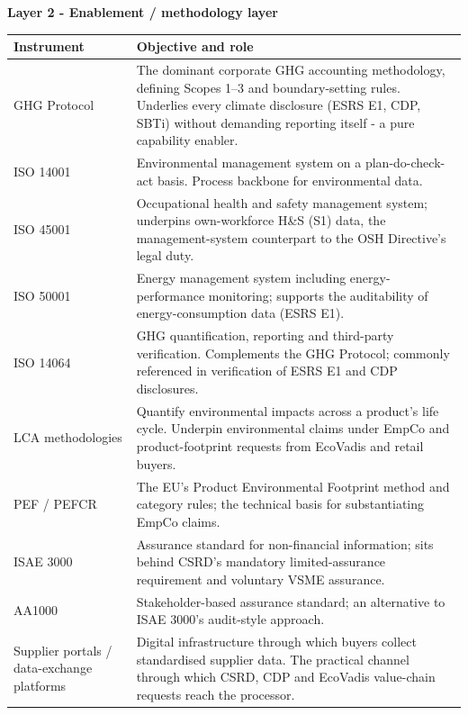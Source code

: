 \vspace{6pt}
\noindent\textbf{Layer 2 - Enablement / methodology layer}
\vspace{2pt}

\footnotesize
\begin{xltabular}{\textwidth}{@{} p{4.1cm} X @{}}
\toprule \textbf{Instrument} & \textbf{Objective and role} \\ \midrule \endhead
GHG Protocol & The dominant corporate GHG accounting methodology, defining Scopes
1--3 and boundary-setting rules. Underlies every climate disclosure (ESRS E1, CDP,
SBTi) without demanding reporting itself - a pure capability enabler. \\
ISO 14001 & Environmental management system on a plan-do-check-act basis. Process
backbone for environmental data. \\
ISO 45001 & Occupational health and safety management system; underpins
own-workforce H\&S (S1) data, the management-system counterpart to the OSH
Directive's legal duty. \\
ISO 50001 & Energy management system including energy-performance monitoring;
supports the auditability of energy-consumption data (ESRS E1). \\
ISO 14064 & GHG quantification, reporting and third-party verification.
Complements the GHG Protocol; commonly referenced in verification of ESRS E1 and
CDP disclosures. \\
LCA methodologies & Quantify environmental impacts across a product's life cycle.
Underpin environmental claims under EmpCo and product-footprint requests from
EcoVadis and retail buyers. \\
PEF / PEFCR & The EU's Product Environmental Footprint method and category rules;
the technical basis for substantiating EmpCo claims. \\
ISAE 3000 & Assurance standard for non-financial information; sits behind CSRD's
mandatory limited-assurance requirement and voluntary VSME assurance. \\
AA1000 & Stakeholder-based assurance standard; an alternative to ISAE 3000's
audit-style approach. \\
Supplier portals / data-exchange platforms & Digital infrastructure through which
buyers collect standardised supplier data. The practical channel through which
CSRD, CDP and EcoVadis value-chain requests reach the processor. \\
\bottomrule
\end{xltabular}
\normalsize

